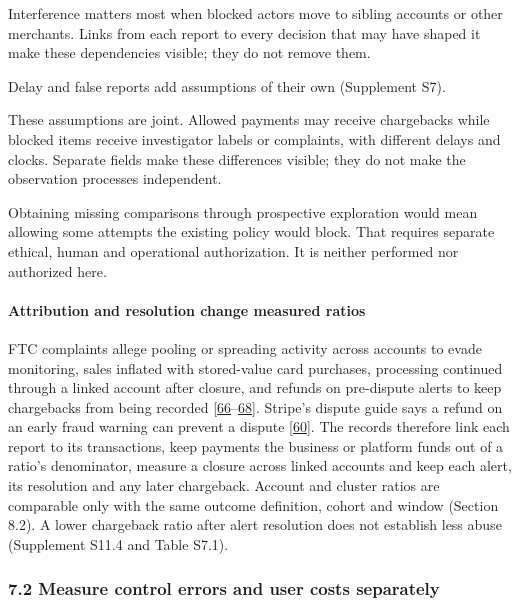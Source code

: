 \documentclass[
  11pt,
]{article}
\begin{document}
Interference matters most when blocked actors move to sibling accounts
or other merchants. Links from each report to every decision that may
have shaped it make these dependencies visible; they do not remove them.

Delay and false reports add assumptions of their own (Supplement S7).

These assumptions are joint. Allowed payments may receive chargebacks
while blocked items receive investigator labels or complaints, with
different delays and clocks. Separate fields make these differences
visible; they do not make the observation processes independent.

Obtaining missing comparisons through prospective exploration would mean
allowing some attempts the existing policy would block. That requires
separate ethical, human and operational authorization. It is neither
performed nor authorized here.

\hypertarget{attribution-and-resolution-change-measured-ratios}{%
\paragraph{Attribution and resolution change measured
ratios}\label{attribution-and-resolution-change-measured-ratios}}

FTC complaints allege pooling or spreading activity across accounts to
evade monitoring, sales inflated with stored-value card purchases,
processing continued through a linked account after closure, and refunds
on pre-dispute alerts to keep chargebacks from being recorded
{[}\protect\hyperlink{ref-FTC2020FirstData}{66}--\protect\hyperlink{ref-FTC2025Paddle}{68}{]}.
Stripe's dispute guide says a refund on an early fraud warning can
prevent a dispute {[}\protect\hyperlink{ref-Stripe2026Disputes}{60}{]}.
The records therefore link each report to its transactions, keep
payments the business or platform funds out of a ratio's denominator,
measure a closure across linked accounts and keep each alert, its
resolution and any later chargeback. Account and cluster ratios are
comparable only with the same outcome definition, cohort and window
(Section 8.2). A lower chargeback ratio after alert resolution does not
establish less abuse (Supplement S11.4 and Table S7.1).

\hypertarget{measure-control-errors-and-user-costs-separately}{%
\subsubsection{7.2 Measure control errors and user costs
separately}\label{measure-control-errors-and-user-costs-separately}}
\end{document}
